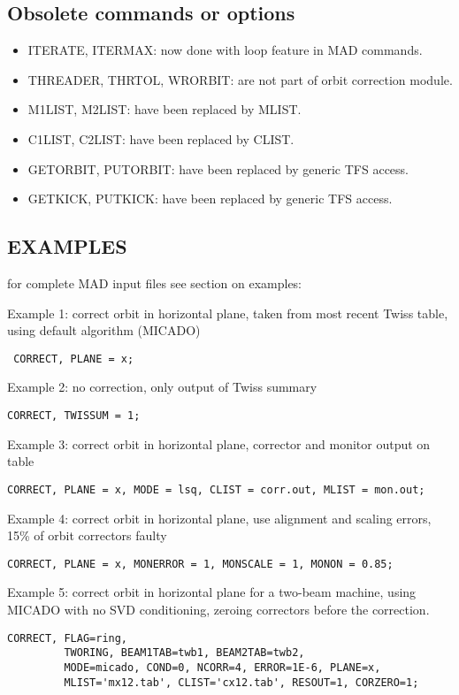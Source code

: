 \subsection{Obsolete commands or options}

\begin{itemize}
\item ITERATE, ITERMAX: now done with loop feature in MAD commands.
\item THREADER, THRTOL, WRORBIT: are not part of orbit correction module.
\item M1LIST, M2LIST: have been replaced by MLIST.
\item C1LIST, C2LIST: have been replaced by CLIST.
\item GETORBIT, PUTORBIT: have been replaced by generic TFS access.
\item GETKICK, PUTKICK: have been replaced by generic TFS access.
\end{itemize}

\subsection{EXAMPLES} 

for complete MAD input files see section on examples:

Example 1: correct orbit in horizontal plane, taken from most recent
Twiss table, using default algorithm (MICADO)
\begin{verbatim}
 CORRECT, PLANE = x; 
\end{verbatim}

Example 2: no correction, only output of Twiss summary 
\begin{verbatim}
CORRECT, TWISSUM = 1; 
\end{verbatim}

Example 3: correct orbit in horizontal plane, corrector and monitor
output on table 
\begin{verbatim}
CORRECT, PLANE = x, MODE = lsq, CLIST = corr.out, MLIST = mon.out;   
\end{verbatim}

Example 4: correct orbit in horizontal plane, use alignment and scaling
errors, 15\% of orbit correctors faulty
\begin{verbatim}
CORRECT, PLANE = x, MONERROR = 1, MONSCALE = 1, MONON = 0.85; 
\end{verbatim}

Example 5: correct orbit in horizontal plane for a two-beam machine,
using MICADO with no SVD conditioning, zeroing correctors before the
correction. 
\begin{verbatim}
CORRECT, FLAG=ring,
         TWORING, BEAM1TAB=twb1, BEAM2TAB=twb2,
         MODE=micado, COND=0, NCORR=4, ERROR=1E-6, PLANE=x,
         MLIST='mx12.tab', CLIST='cx12.tab', RESOUT=1, CORZERO=1;
\end{verbatim}



